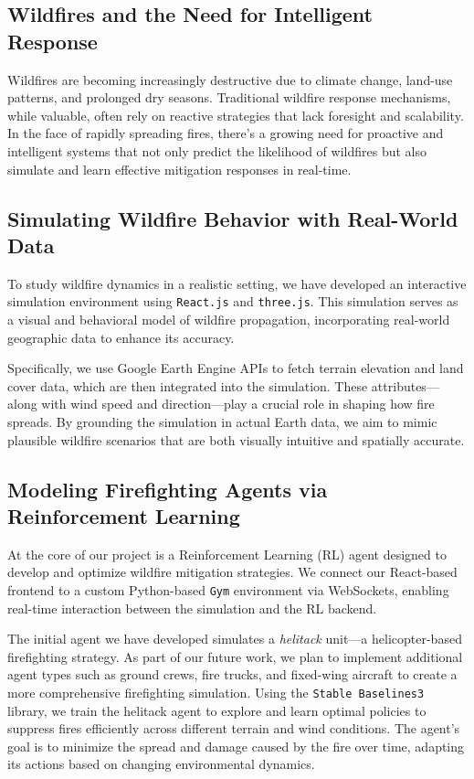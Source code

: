 \documentclass[conference]{IEEEtran}
\begin{document}
\subsection{Wildfires and the Need for Intelligent Response}
Wildfires are becoming increasingly destructive due to climate change, land-use patterns, and prolonged dry seasons. Traditional wildfire response mechanisms, while valuable, often rely on reactive strategies that lack foresight and scalability. In the face of rapidly spreading fires, there's a growing need for proactive and intelligent systems that not only predict the likelihood of wildfires but also simulate and learn effective mitigation responses in real-time.

\subsection{Simulating Wildfire Behavior with Real-World Data}
To study wildfire dynamics in a realistic setting, we have developed an interactive simulation environment using \texttt{React.js} and \texttt{three.js}. This simulation serves as a visual and behavioral model of wildfire propagation, incorporating real-world geographic data to enhance its accuracy.

\noindent
Specifically, we use Google Earth Engine APIs to fetch terrain elevation and land cover data, which are then integrated into the simulation. These attributes—along with wind speed and direction—play a crucial role in shaping how fire spreads. By grounding the simulation in actual Earth data, we aim to mimic plausible wildfire scenarios that are both visually intuitive and spatially accurate.

\subsection{Modeling Firefighting Agents via Reinforcement Learning}
At the core of our project is a Reinforcement Learning (RL) agent designed to develop and optimize wildfire mitigation strategies. We connect our React-based frontend to a custom Python-based \texttt{Gym} environment via WebSockets, enabling real-time interaction between the simulation and the RL backend.

\noindent
The initial agent we have developed simulates a \textit{helitack} unit—a helicopter-based firefighting strategy. As part of our future work, we plan to implement additional agent types such as ground crews, fire trucks, and fixed-wing aircraft to create a more comprehensive firefighting simulation. Using the \texttt{Stable Baselines3} library, we train the helitack agent to explore and learn optimal policies to suppress fires efficiently across different terrain and wind conditions. The agent's goal is to minimize the spread and damage caused by the fire over time, adapting its actions based on changing environmental dynamics.
\end{document}
